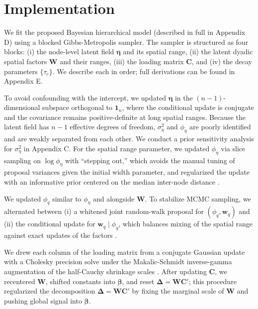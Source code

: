 \documentclass{article}
\begin{document}
\section{Implementation}
\label{sec:implementation}

We fit the proposed Bayesian hierarchical model (described in full in Appendix D) using a blocked Gibbs-Metropolis sampler. The sampler is structured as four blocks: (i) the node-level latent field $\boldsymbol{\eta}$ and its spatial range, (ii) the latent dyadic spatial factors $\mathbf{W}$ and their ranges, (iii) the loading matrix $\mathbf{C}$, and (iv) the decay parameters $\{\tau_c\}$. We describe each in order; full derivations can be found in Appendix E.

To avoid confounding with the intercept, we updated $\boldsymbol{\eta}$ in the $(n-1)$-dimensional subspace orthogonal to $\boldsymbol{1}_n$, where the conditional update is conjugate and the covariance remains positive-definite at long spatial ranges.
Because the latent field has $n-1$ effective degrees of freedom, $\sigma^2_\eta$ and $\phi_\eta$ are poorly identified and are weakly separated from each other. We conduct a prior sensitivity analysis for $\sigma^2_\eta$ in Appendix C.
For the spatial range parameter, we updated $\phi_\eta$ via slice sampling on $\log\phi_\eta$ with ``stepping out,'' which avoids the manual tuning of proposal variances given the initial width parameter, and regularized the update with an informative prior centered on the median inter-node distance \citep[][]{neal2003slice}.

We updated $\phi_q$ similar to $\phi_\eta$ and alongside $\mathbf{W}$. To stabilize MCMC sampling, we alternated between (i) a whitened joint random-walk proposal for $(\phi_q,\mathbf{w}_q)$ and (ii) the conditional update for $\mathbf{w}_q\mid\phi_q$, which balances mixing of the spatial range against exact updates of the factors \citep[][]{van2015metropolis}. 

We drew each column of the loading matrix from a conjugate Gaussian update with a Cholesky precision solve under the Makalic-Schmidt inverse-gamma augmentation of the half-Cauchy shrinkage scales \citep{makalic2015simple}. After updating $\mathbf{C}$, we recentered $\mathbf{W}$, shifted constants into $\boldsymbol{\beta}$, and reset $\boldsymbol{\Delta}=\mathbf{W}\mathbf{C}'$; this procedure regularized the decomposition $\boldsymbol\Delta=\mathbf{WC}'$ by fixing the marginal scale of $\mathbf{W}$ and pushing global signal into $\boldsymbol\beta$.
\end{document}
